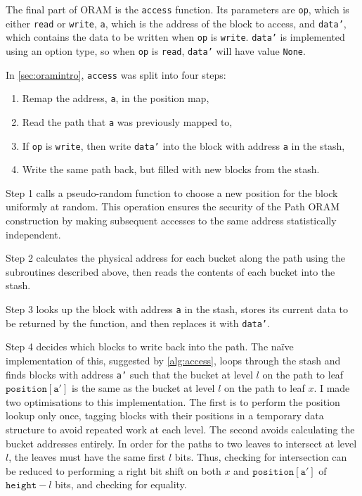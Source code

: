 \documentclass[12pt,a4paper,twoside,openright]{report}
\begin{document}
The final part of ORAM is the \texttt{access} function. Its parameters are \texttt{op}, which is either \texttt{read} or \texttt{write}, \texttt{a}, which is the address of the block to access, and \texttt{data'}, which contains the data to be written when \texttt{op} is \texttt{write}. \texttt{data'} is implemented using an option type, so when \texttt{op} is \texttt{read}, \texttt{data'} will have value \texttt{None}.

In \cref{sec:oramintro}, \texttt{access} was split into four steps:
\begin{enumerate}
    \item Remap the address, \texttt{a}, in the position map,
    \item Read the path that \texttt{a} was previously mapped to,
    \item If \texttt{op} is \texttt{write}, then write \texttt{data'} into the block with address \texttt{a} in the stash,
    \item Write the same path back, but filled with new blocks from the stash.
\end{enumerate}

Step 1 calls a pseudo-random function to choose a new position for the block uniformly at random. This operation ensures the security of the Path ORAM construction by making subsequent accesses to the same address statistically independent.

Step 2 calculates the physical address for each bucket along the path using the subroutines described above, then reads the contents of each bucket into the stash.

Step 3 looks up the block with address \texttt{a} in the stash, stores its current data to be returned by the function, and then replaces it with \texttt{data'}.

Step 4 decides which blocks to write back into the path. The na\"ive implementation of this, suggested by \cref{alg:access}, loops through the stash and finds blocks with address \texttt{a'} such that the bucket at level $l$ on the path to leaf $\mathtt{position[a']}$ is the same as the bucket at level $l$ on the path to leaf $x$. I made two optimisations to this implementation. The first is to perform the position lookup only once, tagging blocks with their positions in a temporary data structure to avoid repeated work at each level. The second avoids calculating the bucket addresses entirely. In order for the paths to two leaves to intersect at level $l$, the leaves must have the same first $l$ bits. Thus, checking for intersection can be reduced to performing a right bit shift on both $x$ and $\mathtt{position[a']}$ of $\mathtt{height} - l$ bits, and checking for equality.
\end{document}
